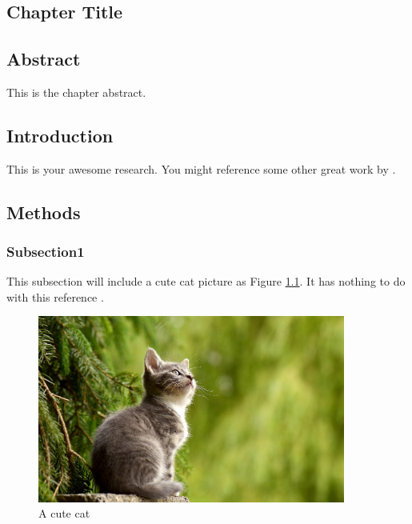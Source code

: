 \chapter{}
\section*{Chapter Title}
\label{ch:1}


\newpage
\section*{Abstract}

This is the chapter abstract.

\newpage
\section{Introduction}

This is your awesome research. You might reference some other great work by \citeauthor*{Reference1} \cite{Reference1}.

\newpage
\section{Methods}
\subsection{Subsection1}
This subsection will include a cute cat picture as Figure \ref{figure:1.1}. It has nothing to do with this reference \cite{Reference2}.

\begin{figure}[h]
\includegraphics[width=0.9\textwidth]{Images/cat1.jpg}
\centering
\caption{A cute cat}
\label{figure:1.1}
\end{figure}


